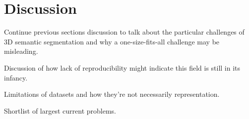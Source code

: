 \section{Discussion}
\label{chap:discussion}

Continue previous sections discussion to talk about the particular challenges of 3D semantic segmentation and why a one-size-fits-all challenge may be misleading.

Discussion of how lack of reproducibility might indicate this field is still in its infancy.

Limitations of datasets and how they're not necessarily representation.

Shortlist of largest current problems.

\newpage
